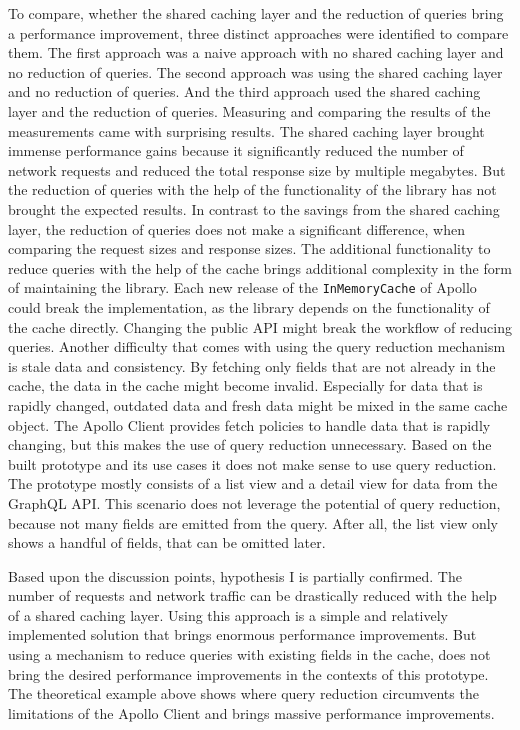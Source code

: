 \noindent To compare, whether the shared caching layer and the reduction of queries bring a performance improvement, three distinct approaches were identified to compare them. The first approach was a naive approach with no shared caching layer and no reduction of queries. The second approach was using the shared caching layer and no reduction of queries. And the third approach used the shared caching layer and the reduction of queries. Measuring and comparing the results of the measurements came with surprising results. The shared caching layer brought immense performance gains because it significantly reduced the number of network requests and reduced the total response size by multiple megabytes. But the reduction of queries with the help of the functionality of the library has not brought the expected results. In contrast to the savings from the shared caching layer, the reduction of queries does not make a significant difference, when comparing the request sizes and response sizes. The additional functionality to reduce queries with the help of the cache brings additional complexity in the form of maintaining the library. Each new release of the \texttt{InMemoryCache} of Apollo could break the implementation, as the library depends on the functionality of the cache directly. Changing the public \ac{API} might break the workflow of reducing queries. Another difficulty that comes with using the query reduction mechanism is stale data and consistency. By fetching only fields that are not already in the cache, the data in the cache might become invalid. Especially for data that is rapidly changed, outdated data and fresh data might be mixed in the same cache object. The Apollo Client provides fetch policies to handle data that is rapidly changing, but this makes the use of query reduction unnecessary. Based on the built prototype and its use cases it does not make sense to use query reduction. The prototype mostly consists of a list view and a detail view for data from the GraphQL \ac{API}. This scenario does not leverage the potential of query reduction, because not many fields are emitted from the query. After all, the list view only shows a handful of fields, that can be omitted later.

\bigskip

\noindent Based upon the discussion points, hypothesis I is partially confirmed. The number of requests and network traffic can be drastically reduced with the help of a shared caching layer. Using this approach is a simple and relatively implemented solution that brings enormous performance improvements. But using a mechanism to reduce queries with existing fields in the cache, does not bring the desired performance improvements in the contexts of this prototype. The theoretical example above shows where query reduction circumvents the limitations of the Apollo Client and brings massive performance improvements.

